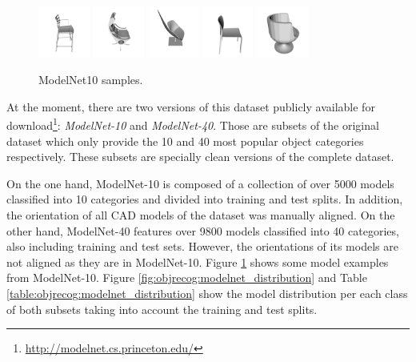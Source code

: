\begin{figure}[!t]
	\includegraphics[width=0.15\textwidth]{Figures/ObjRecog/chair_0}\hfill
	\includegraphics[width=0.15\textwidth]{Figures/ObjRecog/chair_1}\hfill
	\includegraphics[width=0.15\textwidth]{Figures/ObjRecog/chair_2}\hfill
	\includegraphics[width=0.15\textwidth]{Figures/ObjRecog/chair_3}\hfill
	\includegraphics[width=0.15\textwidth]{Figures/ObjRecog/chair_4}\hfill
	\caption{ModelNet10 samples.}
	\label{fig:objrecog:modelnet_models}
\end{figure}

At the moment, there are two versions of this dataset publicly available for download\footnote{\url{http://modelnet.cs.princeton.edu/}}: \emph{ModelNet-10} and \emph{ModelNet-40}. Those are subsets of the original dataset which only provide the \num{10} and \num{40} most popular object categories respectively. These subsets are specially clean versions of the complete dataset.

On the one hand, ModelNet-10 is composed of a collection of over 5000 models classified into 10 categories and divided into training and test splits. In addition, the orientation of all \ac{CAD} models of the dataset was manually aligned. On the other hand, ModelNet-40 features over \num{9800} models classified into \num{40} categories, also including training and test sets. However, the orientations of its models are not aligned as they are in ModelNet-10. Figure \ref{fig:objrecog:modelnet_models} shows some model examples from ModelNet-10. Figure \ref{fig:objrecog:modelnet_distribution} and Table \ref{table:objrecog:modelnet_distribution} show the model distribution per each class of both subsets taking into account the training and test splits. 

